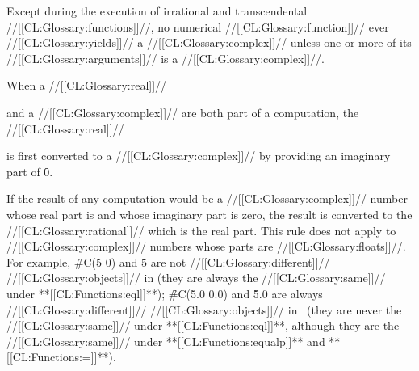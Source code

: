 




Except during the execution of irrational and transcendental //[[CL:Glossary:functions]]//,
no numerical //[[CL:Glossary:function]]// ever //[[CL:Glossary:yields]]// a //[[CL:Glossary:complex]]// unless 
one or more of its //[[CL:Glossary:arguments]]// is a //[[CL:Glossary:complex]]//.

\endsubsubsection%

















When a 
//[[CL:Glossary:real]]//

and 
a //[[CL:Glossary:complex]]// are both part of a computation, 
the 
//[[CL:Glossary:real]]//

is first converted to a //[[CL:Glossary:complex]]// by providing an imaginary part of \f{0}.
\endsubsubsection%



If the result of any computation would be a //[[CL:Glossary:complex]]//
number whose real part is  and whose imaginary
part is zero, the result is converted to the //[[CL:Glossary:rational]]// 
which is the real part.
This rule does not apply to //[[CL:Glossary:complex]]// numbers whose parts
are //[[CL:Glossary:floats]]//. 
For example, \f{\#C(5 0)} and \f{5} are not //[[CL:Glossary:different]]// //[[CL:Glossary:objects]]// in \clisp
(they are always the //[[CL:Glossary:same]]// under **[[CL:Functions:eql]]**);
\f{\#C(5.0 0.0)} and \f{5.0} are always //[[CL:Glossary:different]]// //[[CL:Glossary:objects]]// in \clisp\
(they are never the //[[CL:Glossary:same]]// under **[[CL:Functions:eql]]**,
although they are the //[[CL:Glossary:same]]// under **[[CL:Functions:equalp]]** and **[[CL:Functions:=]]**).


